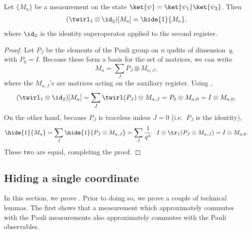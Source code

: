 \begin{proposition}\label{prop:hidden-twirl}
Let $\{M_a\}$ be a measurement on the state $\ket{\psi} = \ket{\psi_1} \ket{\psi_2}$.
Then
\begin{equation*}
(\twirl_1\otimes \id_{2})[M_a]
=
\hide{1}{M_a},
\end{equation*}
where $\id_{2}$ is the identity superoperator applied to the second register.
\end{proposition}
\begin{proof}
Let $P_J$ be the elements of the Pauli group on $n$ qudits of dimension~$q$, with $P_0 = I$.
Because these form a basis for the set of matrices, we can write
\begin{equation*}
M_a = \sum_{J} P_J \otimes M_{a, J},
\end{equation*}
where the $M_{a, J}$'s are matrices acting on the auxiliary register. 
Using ,
\begin{equation*}
(\twirl_1\otimes \id_{2})[M_a]
= \sum_{J}  \twirl(P_J) \otimes M_{a,J}
= P_0 \otimes M_{a,0}
= I \otimes M_{a,0}.
\end{equation*}
On the other hand, because $P_J$ is traceless unless $J=0$ (i.e.\ $P_J$ is the identity),
\begin{equation*}
\hide{1}{M_a}
= \sum_{J} \hide{1}{P_J \otimes M_{a,J}} 
= \sum_{J} \frac{1}{q^n} \cdot I \otimes \tr_1(P_J \otimes M_{a,J})
= I \otimes M_{a, 0}.
\end{equation*}
These two are equal, completing the proof.
\end{proof}

\subsection{Hiding a single coordinate}\label{sec:data-hiding-game}

In this section, we prove . Prior to doing so, we prove a couple of technical lemmas.
The first shows that a measurement which approximately commutes with the Pauli measurements
also approximately commutes with the Pauli observables.


